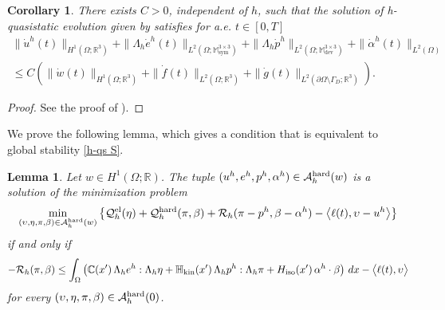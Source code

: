 \documentclass[reqno,10pt]{amsart}
\numberwithin{equation}{section}
\newtheorem{lemma}[theorem]{Lemma}
\newtheorem{corollary}[theorem]{Corollary}
\theoremstyle{remark}
\newcommand{\calA}{\mathcal{A}}
\newcommand{\C}{\mathbb{C}}
\newcommand{\M}{\mathbb{M}}
\newcommand{\calQ}{\mathcal{Q}}
\newcommand{\R}{\mathbb{R}}
\newcommand{\calR}{\mathcal{R}}
\DeclareMathOperator{\dev}{dev}
\DeclareMathOperator{\sym}{sym}
\newcommand{\Hkin}{\mathbb{H}_{\rm kin}}
\newcommand{\Hiso}{H_{\rm iso}}
\begin{document}
\begin{corollary} \label{nakcor}
There exists $C>0$, independent of $h$, such that the solution of h-quasistatic evolution given by  satisfies for a.e. $t \in [0,T]$
	\begin{align} \nonumber
	\|\dot{u}^h(t)\|_{H^1(\Omega;\R^3)} +\|\Lambda_h \dot{e}^h(t)\|_{L^2(\Omega;\M^{3 \times 3}_{\sym})} +\|\Lambda_h \dot{p}^h\|_{L^2(\Omega;\M^{3 \times 3}_{\dev})}+\|\dot{\alpha}^h(t)\|_{L^2(\Omega)} \\ \label{ocjena1} \leq C(\|\dot{w}(t)\|_{H^1(\Omega;\R^3)}+\|\dot{f}(t) \|_{L^2(\Omega;\R^3)}+\|\dot{g}(t)\|_{L^2(\partial \Omega \setminus \Gamma_D;\R^3)}).
	\end{align}
\end{corollary}
\begin{proof} 
See the proof of \cite[Theorem 3.5.2]{Mielke.Roubicek.2015}).
\end{proof}

We prove the following lemma, which gives a condition that is equivalent to global stability \ref{h-qs S}.

\begin{lemma} \label{stability condition equivalence}
Let $w \in H^1(\Omega;\R)$.
The tuple $(u^h, e^h, p^h, \alpha^h) \in \calA_{h}^{\rm hard}(w)$ is a solution of the minimization problem
\begin{equation} \label{minimum problem h}
	\min_{(\upsilon, \eta, \pi, \beta) \in \calA_{h}^{\rm hard}(w)}
	\left\{ 
	\calQ^{\rm el}_{h}(\eta) + \calQ^{\rm hard}_{h}(\pi, \beta) + \calR_{h}(\pi - p^h, \beta - \alpha^h) 
	- \big\langle \ell(t), \upsilon - u^h \big\rangle 
	\right\}
\end{equation}
if and only if
\begin{equation} \label{minimality condition h}
	- \calR_{h}(\pi, \beta) \leq 
	\int_{\Omega} \left( \C\!\left(x'\right) \Lambda_h e^h : \Lambda_h \eta + \Hkin\!\left(x'\right) \Lambda_h p^h : \Lambda_h \pi + \Hiso\!\left(x'\right) \alpha^h \cdot \beta \right) \,dx - \big\langle \ell(t), \upsilon \big\rangle
\end{equation}
for every $(\upsilon, \eta, \pi, \beta) \in \calA_{h}^{\rm hard}(0)$.
\end{lemma}
\end{document}
